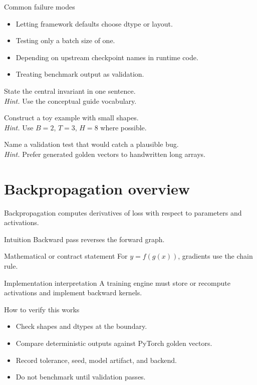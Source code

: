 \begin{warningbox}{Common failure modes}
\begin{itemize}
\item Letting framework defaults choose dtype or layout.
\item Testing only a batch size of one.
\item Depending on upstream checkpoint names in runtime code.
\item Treating benchmark output as validation.
\end{itemize}
\end{warningbox}

\begin{chapterexercises}
\item State the central invariant in one sentence.\\
\textit{Hint.} Use the conceptual guide vocabulary.
\item Construct a toy example with small shapes.\\
\textit{Hint.} Use $B=2$, $T=3$, $H=8$ where possible.
\item Name a validation test that would catch a plausible bug.\\
\textit{Hint.} Prefer generated golden vectors to handwritten long arrays.
\end{chapterexercises}

\chapter{Backpropagation overview}
\label{ch:backprop}
Backpropagation computes derivatives of loss with respect to parameters and activations.



\begin{intuitionbox}{Intuition}
Backward pass reverses the forward graph.
\end{intuitionbox}

\begin{definitionbox}{Mathematical or contract statement}
For \(y=f(g(x))\), gradients use the chain rule.
\end{definitionbox}

\begin{implementationbox}{Implementation interpretation}
A training engine must store or recompute activations and implement backward kernels.
\end{implementationbox}

\begin{verificationbox}{How to verify this works}
\begin{itemize}
\item Check shapes and dtypes at the boundary.
\item Compare deterministic outputs against PyTorch golden vectors.
\item Record tolerance, seed, model artifact, and backend.
\item Do not benchmark until validation passes.
\end{itemize}
\end{verificationbox}

